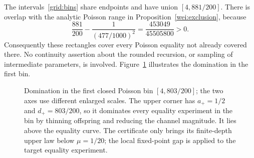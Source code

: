 The intervals~\eqref{grid:bins} share endpoints and have union
$[4,881/200]$.  There is overlap with the analytic Poisson range in
Proposition~\ref{wei:exclusion}, because
\begin{equation}
 \frac{881}{200}-\frac1{(477/1000)^2}
       =\frac{453049}{45505800}>0.
 \label{grid:overlap}
\end{equation}
Consequently these rectangles cover every Poisson equality not already
covered there.  No continuity assertion about the rounded recursion, or
sampling of intermediate parameters, is involved.
Figure~\ref{fig:dominating-bin} illustrates the domination in the first bin.

\begin{figure}[ht]
\centering
{}
\caption{Domination in the first closed Poisson bin
$[4,803/200]$; the two axes use different enlarged scales.
The upper corner has $a_+=1/2$ and $d_+=803/200$, so it dominates
every equality experiment in the bin by thinning offspring and reducing
the channel magnitude.  It lies above the equality curve.
The certificate only brings its finite-depth upper law below $\mu=1/20$;
the local fixed-point gap is applied to the target equality experiment.}
\label{fig:dominating-bin}
\end{figure}

